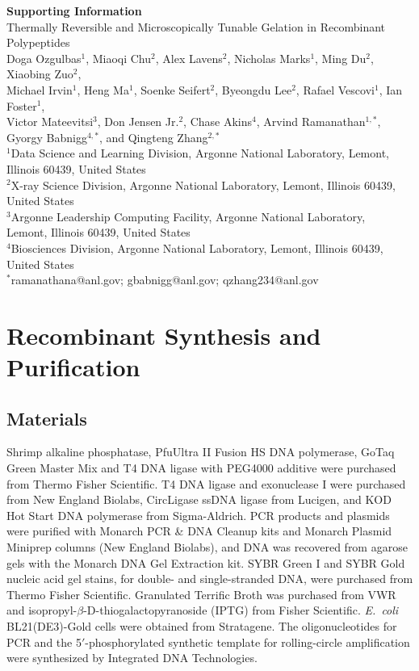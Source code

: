 \documentclass[11pt]{article}
\begin{document}
\begin{center}
{\LARGE\bfseries Supporting Information}\\[0.5em]
{\large Thermally Reversible and Microscopically Tunable Gelation in Recombinant Polypeptides}\\[1.2em]
{\normalsize Doga Ozgulbas$^{1}$, Miaoqi Chu$^{2}$, Alex Lavens$^{2}$, Nicholas Marks$^{1}$, Ming Du$^{2}$, Xiaobing Zuo$^{2}$,\\
Michael Irvin$^{1}$, Heng Ma$^{1}$, Soenke Seifert$^{2}$, Byeongdu Lee$^{2}$, Rafael Vescovi$^{1}$, Ian Foster$^{1}$,\\
Victor Mateevitsi$^{3}$, Don Jensen Jr.$^{2}$, Chase Akins$^{4}$, Arvind Ramanathan$^{1,*}$, Gyorgy Babnigg$^{4,*}$, and Qingteng Zhang$^{2,*}$}\\[0.8em]
{\small $^{1}$Data Science and Learning Division, Argonne National Laboratory, Lemont, Illinois 60439, United States\\
$^{2}$X-ray Science Division, Argonne National Laboratory, Lemont, Illinois 60439, United States\\
$^{3}$Argonne Leadership Computing Facility, Argonne National Laboratory,\\ Lemont, Illinois 60439, United States\\
$^{4}$Biosciences Division, Argonne National Laboratory, Lemont, Illinois 60439, United States}\\[0.6em]
{\small $^{*}$ramanathana@anl.gov; gbabnigg@anl.gov; qzhang234@anl.gov}
\end{center}

\setcounter{tocdepth}{2}
\tableofcontents

\section{Recombinant Synthesis and Purification}

\subsection{Materials}

Shrimp alkaline phosphatase, PfuUltra II Fusion HS DNA polymerase, GoTaq Green Master Mix and T4 DNA ligase with PEG4000 additive were purchased from Thermo Fisher Scientific. T4 DNA ligase and exonuclease I were purchased from New England Biolabs, CircLigase ssDNA ligase from Lucigen, and KOD Hot Start DNA polymerase from Sigma-Aldrich. PCR products and plasmids were purified with Monarch PCR \& DNA Cleanup kits and Monarch Plasmid Miniprep columns (New England Biolabs), and DNA was recovered from agarose gels with the Monarch DNA Gel Extraction kit. SYBR Green I and SYBR Gold nucleic acid gel stains, for double- and single-stranded DNA, were purchased from Thermo Fisher Scientific. Granulated Terrific Broth was purchased from VWR and isopropyl-$\beta$-D-thiogalactopyranoside (IPTG) from Fisher Scientific. \textit{E.~coli} BL21(DE3)-Gold cells were obtained from Stratagene. The oligonucleotides for PCR and the 5$'$-phosphorylated synthetic template for rolling-circle amplification were synthesized by Integrated DNA Technologies.
\end{document}
